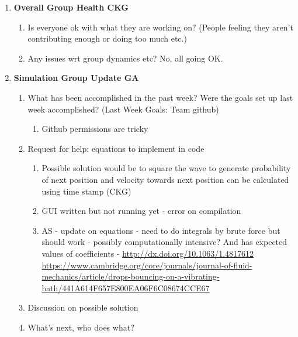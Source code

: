 \begin{enumerate}
\item  \textbf{Overall Group Health CKG}

\begin{enumerate}
\item Is everyone ok with what they are working on? (People feeling they aren't contributing enough or doing too much etc.)

\item  Any issues wrt group dynamics etc? No, all going OK.

\end{enumerate}

\item  \textbf{Simulation Group Update GA}

\begin{enumerate}
\item What has been accomplished in the past week? Were the goals set up last week accomplished? (Last Week Goals: Team github)

\begin{enumerate}
\item  Github permissions are tricky
\end{enumerate}

\item  Request for help: equations to implement in code

\begin{enumerate}
\item  Possible solution would be to square the wave to generate probability of next position and velocity towards next position can be calculated using time stamp (CKG)

\item  GUI written but not running yet - error on compilation

\item  AS - update on equations - need to do integrals by brute force but should work - possibly computationally intensive? And has expected values of coefficients - \url{http://dx.doi.org/10.1063/1.4817612} \url{https://www.cambridge.org/core/journals/journal-of-fluid-mechanics/article/drops-bouncing-on-a-vibrating-bath/441A614F657E800EA06F6C08674CCE67}
\end{enumerate}

\item  Discussion on possible solution

\item  What's next, who does what?


\end{enumerate}
\end{enumerate}
